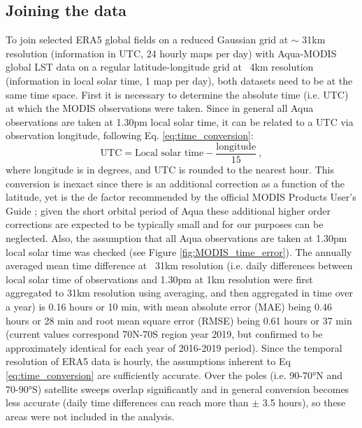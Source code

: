 \documentclass[hess, twostagejnl]{copernicus}
\begin{document}
\subsection{Joining the data}\label{sec:join}
To join selected ERA5 global fields on a reduced Gaussian grid at $\sim$ 31km resolution (information in UTC, 24 hourly maps per day) with Aqua-MODIS global LST data on a regular latitude-longitude grid at ~4km resolution (information in local solar time, 1 map per day), both datasets need to be at the same time space. First it is necessary to determine the absolute time (i.e. UTC) at which the MODIS observations were taken. Since in general all Aqua observations are taken at 1.30pm local solar time, it can be related to a UTC via observation longitude, following Eq. \ref{eq:time_conversion}:
\begin{equation}
	\text{UTC} = \text{Local solar time} - \frac{\text{longitude}}{15} \ , 
	\label{eq:time_conversion}
\end{equation}
where longitude is in degrees, and UTC is rounded to the nearest hour. This conversion is inexact since there is an additional correction as a function of the latitude, yet is the de factor recommended by the official MODIS Products User’s Guide \cite{MODISusersguide}; given the short orbital period of Aqua these additional higher order corrections are expected to be typically small and for our purposes can be neglected. Also, the assumption that all Aqua observations are taken at 1.30pm local solar time was checked (see Figure \ref{fig:MODIS_time_error}). The annually averaged mean time difference at ~31km resolution (i.e. daily differences between local solar time of observations and 1.30pm at 1km resolution were first aggregated to 31km resolution using averaging, and then aggregated in time over a year) is 0.16 hours or 10 min, with mean absolute error (MAE) being 0.46 hours or 28 min and root mean square error (RMSE) being 0.61 hours or 37 min (current values correspond 70N-70S region year 2019, but confirmed to be approximately identical for each year of 2016-2019 period). Since the temporal resolution of ERA5 data is hourly, the assumptions inherent to Eq \ref{eq:time_conversion} are sufficiently accurate. Over the poles (i.e. 90-70°N and 70-90°S) satellite sweeps overlap significantly and in general conversion becomes less accurate (daily time differences can reach more than $\pm$ 3.5 hours), so these areas were not included in the analysis. \newline 
\end{document}
